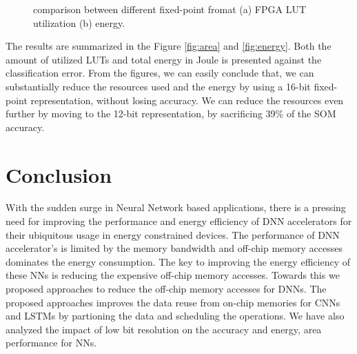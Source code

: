 \documentclass[a4paper,10pt]{article}
\begin{document}
\begin{figure}[!htb]
	\centering
    \captionsetup{font=sf}
	\hfil
	\caption{comparison between different fixed-point fromat (a) FPGA LUT utilization (b) energy.}
	\label{fig:metrics}
\end{figure}

The results are summarized in the Figure \ref{fig:area} and \ref{fig:energy}. Both the amount of utilized LUTs and total energy in Joule is presented against the classification error. From the figures, we can easily conclude that, we can substantially reduce the resources used and the energy by using a 16-bit fixed-point representation, without losing accuracy. We can reduce the resources even further by moving to the 12-bit representation, by sacrificing 39\% of the SOM accuracy. 

\section{Conclusion}
With the sudden surge in Neural Network based applications, there is a pressing need for improving the performance and energy efficiency of DNN accelerators for their ubiquitous usage in energy constrained devices. The performance of DNN accelerator's is limited by the memory bandwidth and off-chip memory accesses dominates the energy consumption. The key to improving the energy efficiency of these NNs is reducing the expensive off-chip memory accesses. Towards this we proposed approaches to reduce the off-chip memory accesses for DNNs. The proposed approaches improves the data reuse from on-chip memories for CNNs and LSTMs by partioning the data and scheduling the operations. We have also analyzed the impact of low bit resolution on the accuracy and energy, area performance for NNs. 

\footnotesize

\end{document}
